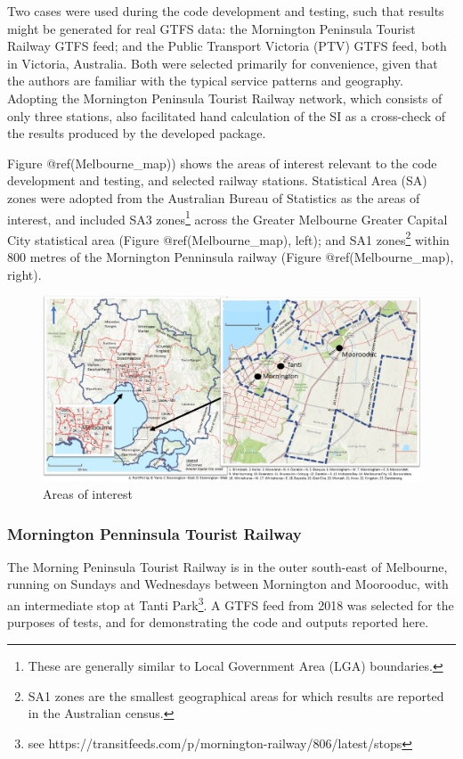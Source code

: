 \documentclass[preprint, 3p,
authoryear]{elsarticle} %
\begin{document}
Two cases were used during the code development and testing, such that
results might be generated for real GTFS data: the Mornington Peninsula
Tourist Railway GTFS feed; and the Public Transport Victoria (PTV) GTFS
feed, both in Victoria, Australia. Both were selected primarily for
convenience, given that the authors are familiar with the typical
service patterns and geography. Adopting the Mornington Peninsula
Tourist Railway network, which consists of only three stations, also
facilitated hand calculation of the SI as a cross-check of the results
produced by the developed package.

Figure @ref(Melbourne\_map)) shows the areas of interest relevant to the
code development and testing, and selected railway stations. Statistical
Area (SA) zones were adopted from the Australian Bureau of Statistics
\citep{ABSmaps} as the areas of interest, and included SA3
zones\footnote{These are generally similar to Local Government Area
  (LGA) boundaries.} across the Greater Melbourne Greater Capital City
statistical area (Figure @ref(Melbourne\_map), left); and SA1
zones\footnote{SA1 zones are the smallest geographical areas for which
  results are reported in the Australian census.} within 800 metres of
the Mornington Penninsula railway (Figure @ref(Melbourne\_map), right).

\begin{figure}
\includegraphics[width=1\linewidth]{graphics/all_maps} \caption{Areas of interest}\label{fig:Melbourne_map}
\end{figure}

\subsubsection{Mornington Penninsula Tourist
Railway}\label{mornington-penninsula-tourist-railway}

The Morning Peninsula Tourist Railway is in the outer south-east of
Melbourne, running on Sundays and Wednesdays between Mornington and
Moorooduc, with an intermediate stop at Tanti Park\footnote{see
  https://transitfeeds.com/p/mornington-railway/806/latest/stops}. A
GTFS feed from 2018 was selected for the purposes of tests, and for
demonstrating the code and outputs reported here.
\end{document}
